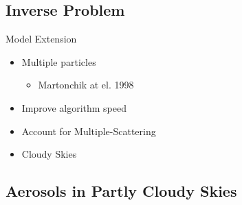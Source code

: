 \documentclass[compress,red,12pt]{beamer}
\begin{document}

\subsection{Inverse Problem}

\begin{frame}{Model Extension}
  \begin{itemize}
  \item Multiple particles
    \begin{itemize}
    \item Martonchik at el. 1998
    \end{itemize}
  \item Improve algorithm speed
  \item Account for Multiple-Scattering
  \item Cloudy Skies
  \end{itemize}

\end{frame}


\subsection{Aerosols in Partly Cloudy Skies}
\end{document}
